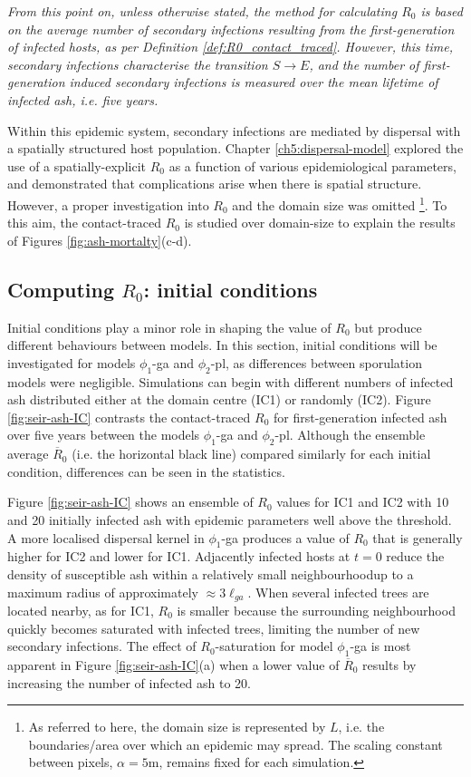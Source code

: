 \textit{From this point on, unless otherwise stated, the method for calculating $R_0$ is based on the average number of secondary infections resulting from the first-generation of infected hosts, as per Definition \ref{def:R0_contact_traced}. However, this time, secondary infections characterise the transition $S\rightarrow E$, and the number of first-generation induced secondary infections is measured over the mean lifetime of infected ash, i.e. five years.}

Within this epidemic system, secondary infections are mediated by dispersal with a spatially structured host population.
Chapter \ref{ch5:dispersal-model} explored the use of a spatially-explicit $R_0$ as a function of various epidemiological parameters,
and demonstrated that complications arise when there is spatial structure.
However, a proper investigation into $R_0$ and the domain size was omitted
\footnote{As referred to here, the domain size is represented by $L$, i.e. the boundaries/area over which an epidemic may spread. The scaling constant between pixels, $\alpha=5\mathrm{m}$, remains fixed for each simulation.}.
To this aim, the contact-traced $R_0$ is studied over domain-size to explain the results of Figures \ref{fig:ash-mortalty}(c-d).

\subsection{Computing $R_0$: initial conditions}

\label{section:initial-conditions}

Initial conditions play a minor role in shaping the value of $R_0$ but produce different behaviours between models. 
In this section, initial conditions will be investigated for models $\phi_1$-ga and $\phi_2$-pl, as differences between sporulation models were negligible.
Simulations can begin with different numbers of infected ash distributed either at the domain centre (IC1) or randomly (IC2).
Figure \ref{fig:seir-ash-IC} contrasts the contact-traced $R_0$ for first-generation infected ash over five years between the models $\phi_1$-ga and $\phi_2$-pl.
Although the ensemble average $\overline{R}_0$ (i.e. the horizontal black line) compared similarly for each initial condition, differences can be seen in the statistics.

Figure \ref{fig:seir-ash-IC} shows an ensemble of $R_0$ values for IC1 and IC2 with 10 and 20 initially infected ash with epidemic parameters well above the threshold.
A more localised dispersal kernel in $\phi_1$-ga produces a value of $R_0$ that is generally higher for IC2 and lower for IC1.
Adjacently infected hosts at $t=0$ reduce the density of susceptible ash within a relatively small neighbourhood\textemdash up to a maximum radius of approximately $\approx 3\ell_{ga}$.
When several infected trees are located nearby, as for IC1, $R_0$ is smaller because the surrounding neighbourhood quickly becomes saturated with infected trees, limiting the number of new secondary infections.
The effect of $R_0$-saturation for model $\phi_1$-ga is most apparent in Figure \ref{fig:seir-ash-IC}(a) when a lower value of $\overline{R}_0$ results by increasing the number of infected ash to 20.

